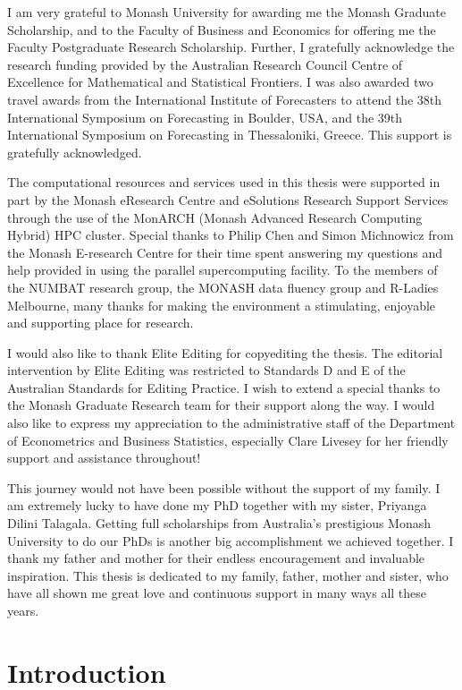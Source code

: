 \documentclass{monashthesis}
\begin{document}
I am very grateful to Monash University for awarding me the Monash Graduate Scholarship, and to the Faculty of Business and Economics for offering me the Faculty Postgraduate Research Scholarship. Further, I gratefully acknowledge the research funding provided by the Australian Research Council Centre of Excellence for Mathematical and Statistical Frontiers. I was also awarded two travel awards from the International Institute of Forecasters to attend the 38th International Symposium on Forecasting in Boulder, USA, and the 39th International Symposium on Forecasting in Thessaloniki, Greece. This support is gratefully acknowledged.

The computational resources and services used in this thesis were supported in part by the Monash eResearch Centre and eSolutions Research Support Services through the use of the MonARCH (Monash Advanced Research Computing Hybrid) HPC cluster. Special thanks to Philip Chen and Simon Michnowicz from the Monash E-research Centre for their time spent answering my questions and help provided in using the parallel supercomputing facility. To the members of the NUMBAT research group, the MONASH data fluency group and R-Ladies Melbourne, many thanks for making the environment a stimulating, enjoyable and supporting place for research.

I would also like to thank Elite Editing for copyediting the thesis. The editorial intervention by Elite Editing was restricted to Standards D and E of the Australian Standards for Editing Practice. I wish to extend a special thanks to the Monash Graduate Research team for their support along the way. I would also like to express my appreciation to the administrative staff of the Department of Econometrics and Business Statistics, especially Clare Livesey for her friendly support and assistance throughout!

This journey would not have been possible without the support of my family. I am extremely lucky to have done my PhD together with my sister, Priyanga Dilini Talagala. Getting full scholarships from Australia's prestigious Monash University to do our PhDs is another big accomplishment we achieved together. I thank my father and mother for their endless encouragement and invaluable inspiration. This thesis is dedicated to my family, father, mother and sister, who have all shown me great love and continuous support in many ways all these years.

\clearpage{}\setcounter{page}{0}

\hypertarget{ch:intro}{%
\chapter{Introduction}\label{ch:intro}}
\end{document}

